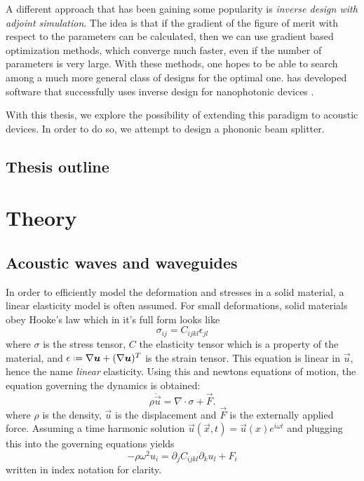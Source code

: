 \documentclass[11pt]{article}
\begin{document}
A different approach that has been gaining some popularity is
\emph{inverse design with adjoint simulation}.
The idea is that if the gradient of the figure of merit
with respect to the parameters can be calculated, then we can use gradient based
optimization methods, which converge much faster, even if the number of
parameters is very large. With these methods, one hopes to be able to search
among a much more general class of designs for the optimal one.
\citeauthor{spins2019} has developed software that successfully uses inverse design for
nanophotonic devices \cite{spins2019}.

With this thesis, we explore the possibility of extending this paradigm to
acoustic devices. In order to do so, we attempt to design a phononic beam
splitter.

\subsection{Thesis outline}

\section{Theory}

\subsection{Acoustic waves and waveguides}

In order to efficiently model the deformation and stresses in a solid material,
a linear elasticity model is often assumed.
For small deformations, solid materials obey Hooke's law which in it's full form
looks like
\[
	\sigma_{ij} = C_{ijkl} \epsilon_{jl}
\]
where $\sigma$ is the stress tensor, $C$ the elasticity tensor which is a
property of the material, and 
$\epsilon \defeq \nabla \vec u + (\nabla \vec u)^T$
is the strain tensor.
This equation is linear in $\vec u$, hence the name \emph{linear} elasticity.
Using this and newtons equations of motion, the equation governing the dynamics
is obtained:
\[
	\rho \ddot{\vec{u}} = \nabla \cdot \sigma + \vec F.
\]
where $\rho$ is the density, $\vec{u}$ is the displacement and $\vec F$ is the
externally applied force.
Assuming a time harmonic solution
$\vec u(\vec x, t) = \vec u(x) e^{i \omega t}$ and plugging this into
the governing equations yields
\begin{equation}\label{eq:gov_eq}
	-\rho \omega^2 u_i = \partial_j C_{ijkl} \partial_k u_l + F_i
\end{equation}
written in index notation for clarity. 
\end{document}
